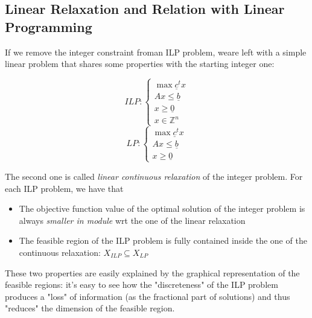\documentclass{article}
\begin{document}
		\subsection{Linear Relaxation and Relation with Linear Programming}
			If we remove the integer constraint froman ILP problem, weare left with a simple linear problem that shares some properties with the starting integer one:
			\begin{multicols}{2}
				\begin{equation}
					ILP: 
					\begin{cases}
						\max \underline{c}^tx \\
						Ax \leq \underline{b} \\
						x \geq \underline{0} \\
						x \in \mathbb{Z}^n
					\end{cases}
				\end{equation}	
				\break
				\begin{equation}
					LP:
					\begin{cases}
						\max \underline{c}^tx \\
						Ax \leq \underline{b} \\
						x \geq \underline{0}
					\end{cases}
				\end{equation}
			\end{multicols}
			The second one is called \textit{linear continuous relaxation} of the integer problem. For each ILP problem, we have that
			\begin{itemize}
				\item The objective function value of the optimal solution of the integer problem is always \textit{smaller in module} wrt the one of the linear relaxation
				\item The feasible region of the ILP problem is fully contained inside the one of the continuous relaxation: $X_{ILP} \subseteq X_{LP}$
			\end{itemize}
			\begin{minipage}{0.5\linewidth}
				These two properties are easily explained by the graphical representation of the feasible regions: it's easy to see how the "discreteness" of the ILP problem produces a "loss" of information (as the fractional part of solutions) and thus "reduces" the dimension of the feasible region.
			\end{minipage}
\end{document}
